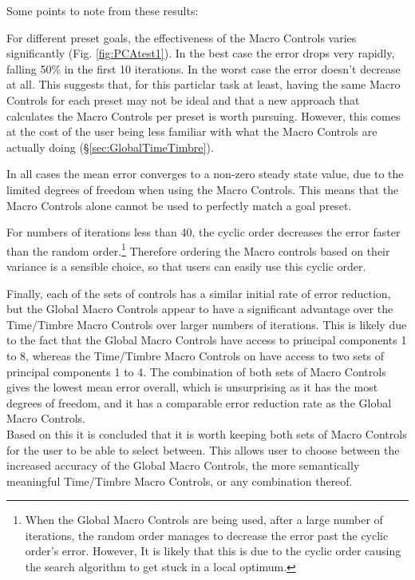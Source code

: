 \documentclass[11pt, oneside]{report}   	%
\begin{document}
Some points to note from these results:

For different preset goals, the effectiveness of the Macro Controls varies significantly (Fig. \ref{fig:PCAtest1}). In the best case the error drops very rapidly, falling 50\% in the first 10 iterations. In the worst case the error doesn't decrease at all. This suggests that, for this particlar task at least, having the same Macro Controls for each preset may not be ideal and that a new approach that calculates the Macro Controls per preset is worth pursuing. However, this comes at the cost of the user being less familiar with what the Macro Controls are actually doing (\S \ref{sec:GlobalTimeTimbre}).

In all cases the mean error converges to a non-zero steady state value,  due to the limited degrees of freedom when using the Macro Controls. This means that the Macro Controls alone cannot be used to perfectly match a goal preset.

For numbers of iterations less than 40, the cyclic order decreases the error faster than the random order.\footnote{
When the Global Macro Controls are being used, after a large number of iterations, the random order manages to decrease the error past the cyclic order's error. However, It is likely that this is due to the cyclic order causing the search algorithm to get stuck in a local optimum.} Therefore ordering the Macro controls based on their variance is a sensible choice, so that users can easily use this cyclic order. 

Finally, each of the sets of controls has a similar initial rate of error reduction, but the Global Macro Controls appear to have a significant advantage over the Time/Timbre Macro Controls over larger numbers of iterations. This is likely due to the fact that the Global Macro Controls have access to principal components 1 to 8, whereas the Time/Timbre Macro Controls on have access to two sets of principal components 1 to 4. The combination of both sets of Macro Controls gives the lowest mean error overall, which is unsurprising as it has the most degrees of freedom, and it has a comparable error reduction rate as the Global Macro Controls.\\
%
Based on this it is concluded that it is worth keeping both sets of Macro Controls for the user to be able to select between. This allows user to choose between the increased accuracy of the Global Macro Controls, the more semantically meaningful Time/Timbre Macro Controls, or any combination thereof.
\end{document}
